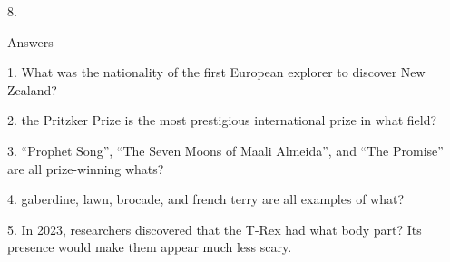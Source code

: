\begin{frame}
\begin{center}
\Large
8. 
\end{center}
\end{frame}
\begin{frame}
\begin{center}
\Huge
Answers
\end{center}
\end{frame}
\begin{frame}
\begin{center}
\Large
1. What was the nationality of the first European explorer to discover New Zealand?
\\
\end{center}
\end{frame}
\begin{frame}
\begin{center}
\Large
2. the Pritzker Prize is the most prestigious international prize in what field?
\\
\end{center}
\end{frame}
\begin{frame}
\begin{center}
\Large
3. ``Prophet Song'', ``The Seven Moons of Maali Almeida'', and ``The Promise'' are all prize-winning whats?
\\
\end{center}
\end{frame}
\begin{frame}
\begin{center}
\Large
4. gaberdine, lawn, brocade, and french terry are all examples of what?
\\
\end{center}
\end{frame}
\begin{frame}
\begin{center}
\Large
5. In 2023, researchers discovered that the T-Rex had what body part? Its presence would make them appear much less scary.
\\
\end{center}
\end{frame}
